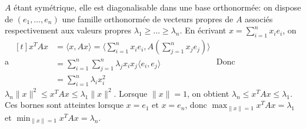 \documentclass{report}
\begin{document}
\subsection{} \noindent{}\\ 
\\ 
\\
\noindent $A$ étant symétrique, elle est diagonalisable dans une base orthonormée: on dispose de $(e_1,\ldots,e_n)$ une famille orthonormée de vecteurs propres de $A$ associés respectivement aux valeurs propres $\lambda_1 \geq \ldots \geq \lambda_n$.\newline
En écrivant $x=\sum_{i=1}^n x_i e_i$, on a $\begin{aligned}[t]
x^TAx &= \langle x,Ax \rangle = \langle \sum_{i=1}^n x_i e_i, A\left( \sum_{j=1}^n x_j e_j\right) \rangle \\
&= \sum_{i=1}^n \sum_{j=1}^n \lambda _j x_i x_j \langle e_i,e_j \rangle \\
&= \sum_{i=1}^n \lambda_i x_i^2
\end{aligned}$\newline
Donc $\lambda_n \|x\|^2 \leq x^TAx \leq \lambda_1 \|x\|^2$. Lorsque $\|x\|=1$, on obtient $\lambda_n \leq x^TAx \leq \lambda_1$.\newline
Ces bornes sont atteintes lorsque $x=e_1$ et $x=e_n$, donc $\max_{\|x\|=1} x^TAx = \lambda_1$ et $\min_{\|x\|=1} x^TAx = \lambda_n$.
\end{document}
